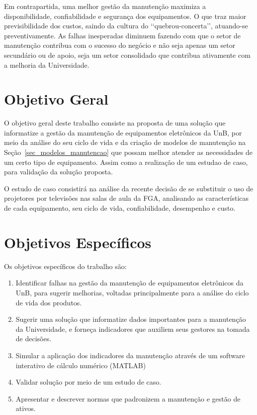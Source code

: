 Em contrapartida, uma melhor gestão da manutenção maximiza a disponibilidade, confiabilidade e segurança dos equipamentos. O que traz maior previsibilidade dos custos, saindo da cultura do \lq\lq quebrou-concerta\rq\rq, atuando-se preventivamente. As falhas inesperadas diminuem fazendo com que o setor de manutenção contribua com o sucesso do negócio e não seja apenas um setor secundário ou de apoio, seja um setor consolidado que contribua ativamente com a melhoria da Universidade.




\section{Objetivo Geral}
 
O objetivo geral deste trabalho consiste na proposta de uma solução que informatize a gestão da manutenção de equipamentos eletrônicos da UnB, por meio da análise do seu ciclo de vida e da criação de modelos de manutenção na Seção~\ref{sec_modelos_manutencao} que possam melhor atender as necessidades de um certo tipo de equipamento. Assim como a realização de um estudao de caso, para validação da solução proposta. 

O estudo de caso consistirá na análise da recente decisão de se substituir o uso de projetores por televisões nas salas de aula da FGA, analisando as características de cada equipamento, seu ciclo de vida, confiabilidade, desempenho e custo.



\section{Objetivos Específicos}

Os objetivos específicos do trabalho são:

\begin{enumerate}
	\item Identificar falhas na gestão da manutenção de equipamentos eletrônicos da UnB, para sugerir melhorias, voltadas principalmente para a análise do ciclo de vida dos produtos.
	\item Sugerir uma solução que informatize dados importantes para a manutenção da Universidade, e forneça indicadores que auxiliem seus gestores na tomada de decisões.
	\item Simular a aplicação dos indicadores da manutenção através de um software interativo de cálculo numérico (MATLAB) 
	\item Validar solução por meio de um estudo de caso.
	\item Apresentar e descrever normas que padronizem a manutenção e gestão de ativos.
\end{enumerate}

%







